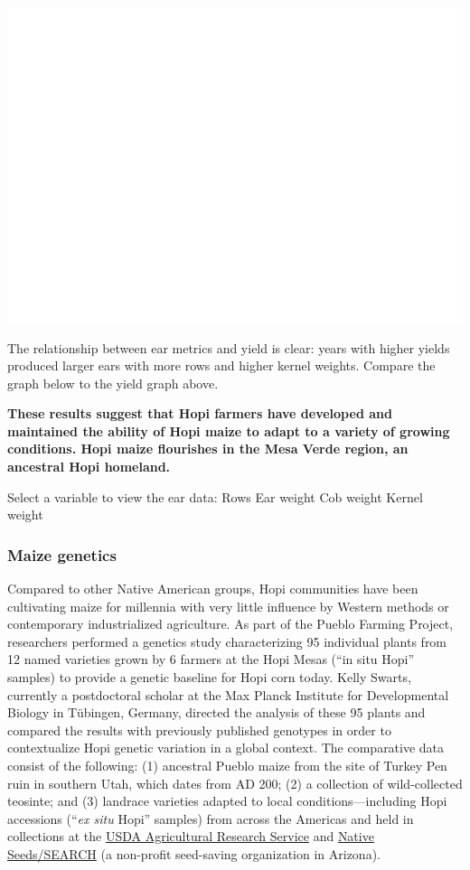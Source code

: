 \documentclass[12pt,]{article}
\begin{document}
\includegraphics{images/ear-summary-data-1.pdf}

The relationship between ear metrics and yield is clear: years with higher yields produced larger ears with more rows and higher kernel weights. Compare the graph below to the yield graph above.

\textbf{These results suggest that Hopi farmers have developed and maintained the ability of Hopi maize to adapt to a variety of growing conditions. Hopi maize flourishes in the Mesa Verde region, an ancestral Hopi homeland.}

Select a variable to view the ear data:
Rows
Ear weight
Cob weight
Kernel weight

\hypertarget{maize-genetics}{%
\subsubsection*{Maize genetics}\label{maize-genetics}}

Compared to other Native American groups, Hopi communities have been cultivating maize for millennia with very little influence by Western methods or contemporary industrialized agriculture. As part of the Pueblo Farming Project, researchers performed a genetics study characterizing 95 individual plants from 12 named varieties grown by 6 farmers at the Hopi Mesas (``in situ Hopi'' samples) to provide a genetic baseline for Hopi corn today. Kelly Swarts, currently a postdoctoral scholar at the Max Planck Institute for Developmental Biology in Tübingen, Germany, directed the analysis of these 95 plants and compared the results with previously published genotypes in order to contextualize Hopi genetic variation in a global context. The comparative data consist of the following: (1) ancestral Pueblo maize from the site of Turkey Pen ruin in southern Utah, which dates from AD 200; (2) a collection of wild-collected teosinte; and (3) landrace varieties adapted to local conditions---including Hopi accessions (``\emph{ex situ} Hopi'' samples) from across the Americas and held in collections at the \href{https://www.ars.usda.gov/}{USDA Agricultural Research Service} and \href{https://www.nativeseeds.org/}{Native Seeds/SEARCH} (a non-profit seed-saving organization in Arizona).
\end{document}
